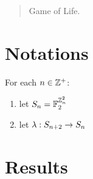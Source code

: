 \documentclass{paper}
\begin{document}

\begin{center}
{\Large \mytitle}
\end{center}

\bigskip

\begin{abstract}
Game of Life.
\end{abstract}

\bigskip

\tableofcontents

\begin{flushleft}


\section{Notations}

For each $n \in \mathbb{Z}^+$:
\begin{enumerate}
\item let $S_{n} = \mathbb{F}_2 ^ {\mathbb{Z}_n ^ 2}$
\item let $\lambda: S_{n+2} \to S_{n}$
\end{enumerate}


\section{Results}

\begin{conjecture}

\end{conjecture}


\end{flushleft}
\end{document}
